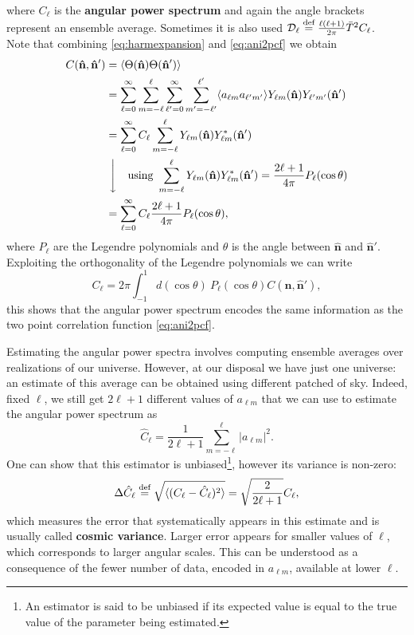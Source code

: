 where $C_{\ell}$ is the \textbf{angular power spectrum} and again the angle brackets represent an ensemble average. Sometimes it is also used $\mathcal{D}_\ell \stackrel{\text{def}}{=} \frac{\ell(\ell+1)}{2\pi}\bar{T}^2C_{\ell}$.\\
Note that combining \eqref{eq:harmexpansion} and \eqref{eq:ani2pcf} we obtain
\begin{align*}
    C(\mathbf{\hat{n}},\mathbf{\hat{n}}') &= \langle \Theta(\mathbf{\hat{n}})\Theta(\mathbf{\hat{n}}') \rangle \\ &= \sum_{\ell=0}^{\infty} \sum_{m=-\ell}^{\ell}  \sum_{\ell'=0}^{\infty} \sum_{m'=-\ell'}^{\ell'} \langle a_{\ell m} a_{\ell' m'} \rangle Y_{\ell m}(\mathbf{\hat{n}})Y_{\ell' m'}(\mathbf{\hat{n}}')\\
    &= \sum_{\ell=0}^{\infty}C_{\ell} \sum_{m=-\ell}^{\ell}  Y_{\ell m}(\mathbf{\hat{n}})Y^*_{\ell m}(\mathbf{\hat{n}}')\\
    &\ \Bigg\downarrow\quad \text{using } \sum_{m=-\ell}^{\ell}Y_{\ell m}(\mathbf{\hat{n}})Y^*_{\ell m}(\mathbf{\hat{n}}')=\frac{2\ell+1}{4\pi}P_{\ell}(\cos\theta)\\
    &=\sum_{\ell=0}^{\infty} C_{\ell}\frac{2\ell+1}{4\pi}P_{\ell}(\cos\theta),
    \end{align*}
where $P_{\ell}$ are the Legendre polynomials and $\theta$ is the angle between $\mathbf{\hat{n}}$ and $\mathbf{\hat{n}}'$.
Exploiting the orthogonality of the Legendre polynomials we can write
\begin{equation}\label{eq:cl}
    C_{\ell} = 2\pi\int_{-1}^{1}d(\cos\theta)\ P_{\ell}(\cos\theta)C(\mathbf{\hat{n}},\mathbf{\hat{n}}'),
\end{equation}
this shows that the angular power spectrum encodes the same information as the two point correlation function \eqref{eq:ani2pcf}. 

Estimating the angular power spectra involves computing ensemble averages over realizations of our universe. However, at our disposal we have just one universe: an estimate of this average can be obtained using different patched of sky. Indeed, fixed $\ell$, we still get $2\ell+1$ different values of $a_{\ell  m}$ that we can use to estimate the angular power spectrum as
\begin{equation}\label{eq:cl_estimate}
    \hat{C}_{\ell} = \frac{1}{2\ell+1}\sum_{m=-\ell}^{\ell} |a_{\ell m}|^2.
\end{equation}
One can show that this estimator is unbiased\footnote{An estimator is said to be unbiased if its expected value is equal to the true value of the parameter being estimated.}, however its variance is non-zero:
\begin{equation}\label{eq:cl_variance}
    \Delta\hat{C}_{\ell} \stackrel{\text{def}}{=}\sqrt{\langle(C_\ell -\hat C_\ell)^2\rangle} = \sqrt{\frac{2}{2\ell+1}}C_{\ell},
\end{equation} 
which measures the error that systematically appears in this estimate and is usually called \textbf{cosmic variance}. Larger error appears for smaller values of $\ell$, which corresponds to larger angular scales. This can be understood as a consequence of the fewer number of data, encoded in $a_{\ell m}$, available at lower $\ell$. 

